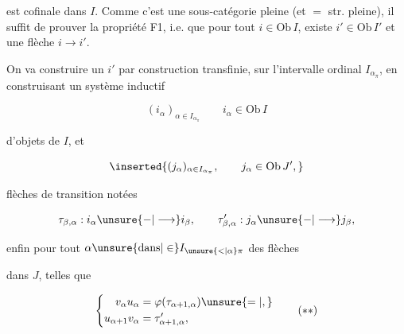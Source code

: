 
est cofinale dans $I$. Comme c'est une sous-catégorie pleine (et $=$ str. pleine), il suffit de prouver la propriété F1, i.e. que pour tout $i\in\mathrm{Ob}\,I$, existe $i'\in\mathrm{Ob}\,I'$  et une flèche $i\longrightarrow i'$.

On va construire un $i'$ par construction transfinie, sur l'intervalle ordinal $I_{\alpha_\pi}$, en construisant un système inductif

\[
(i_\alpha)_{\alpha\in I_{\alpha_\pi}}\qquad i_\alpha\in\mathrm{Ob}\,I
\]

d'objets de $I$, et    

\[
\inserted{(j_\alpha)_{\alpha\in I_{\alpha_\pi}},\qquad j_\alpha\in\mathrm{Ob}\,J',}
\]

 flèches de transition notées

\[
\tau_{\beta,\alpha}:i_\alpha\unsure{-|\longrightarrow}i_\beta,\qquad
\tau'_{\beta,\alpha}:j_\alpha\unsure{-|\longrightarrow}j_\beta,
\]

enfin pour tout $\alpha\unsure{\text{dans}|\in}I_{\unsure{<|\alpha}\pi}$ des flèches


dans $J$, telles que

\[
\left\{\begin{aligned}
v_\alpha u_\alpha&=\varphi(\tau_{\alpha+1,\alpha})\unsure{=|,}\\
u_{\alpha+1}v_\alpha&=\tau'_{\alpha+1,\alpha},
\end{aligned}\right.\tag*{$(**)$}
\]


